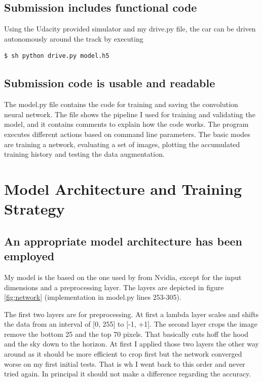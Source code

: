 \documentclass[a4paper, 11pt, DIV=14]{scrartcl}
\begin{document}
\subsection{Submission includes functional code}
Using the Udacity provided simulator and my drive.py file, the car can be driven autonomously around the track by executing 

\begin{lstlisting}[language=bash]
  $ sh python drive.py model.h5
\end{lstlisting}

\subsection{Submission code is usable and readable}
The model.py file contains the code for training and saving the convolution neural network. The file shows the pipeline I used for training and validating the model, and it contains comments to explain how the code works. The program executes different actions based on command line parameters. The basic modes are training a network, evaluating a set of images, plotting the accumulated training history and testing the data augmentation.

\section{Model Architecture and Training Strategy}

\subsection{An appropriate model architecture has been employed}

My model is the based on the one used by \textcite{NVidia} from Nvidia, except for the input dimensions and a preprocessing layer. The layers are depicted in figure \ref{fig:network} (implementation in model.py lines 253-305).

The first two layers are for preprocessing. At first a lambda layer scales and shifts the data from an interval of [0, 255] to [-1, +1]. The second layer crops the image remove the bottom 25 and the top 70 pixels. That basically cuts hoff the hood and the sky down to the horizon. At first I applied those two layers the other way around as it should be more efficient to crop first but the network converged worse on my first initial tests. That is wh I went back to this order and never tried again. In principal it should not make a difference regarding the accuracy.
\end{document}
